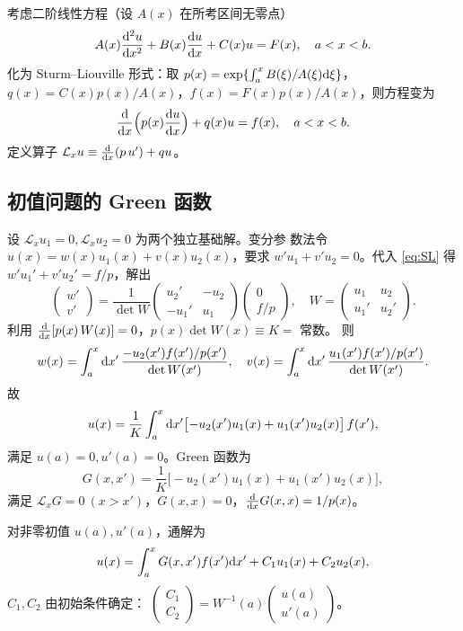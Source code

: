 考虑二阶线性方程（设 $A(x)$ 在所考区间无零点）
\begin{equation}\label{eq:A-2nd}
A(x)\frac{\mathrm{d}^2 u}{\mathrm{d} x^2}+B(x)\frac{\mathrm{d} u}{\mathrm{d} x}+C(x)u=F(x),
\quad a<x<b.
\end{equation}
化为 Sturm--Liouville 形式：取 $p(x)=\exp\{\int_a^x B(\xi)/A(\xi)\mathrm{d}\xi\}$，
$q(x)=C(x)p(x)/A(x)$，$f(x)=F(x)p(x)/A(x)$，则方程变为
\begin{equation}\label{eq:SL}
\frac{\mathrm{d}}{\mathrm{d} x}\Bigl(p(x)\frac{\mathrm{d} u}{\mathrm{d} x}\Bigr)+q(x)u=f(x),
\quad a<x<b.
\end{equation}
定义算子 $\mathcal L_x u\equiv \frac{\mathrm{d}}{\mathrm{d} x}(p\,u')+q u$。

\subsection*{初值问题的 Green 函数}

设 $\mathcal L_x u_1=0,\mathcal L_x u_2=0$ 为两个独立基础解。变分参
数法令 $u(x)=w(x)u_1(x)+v(x)u_2(x)$，要求 $w'u_1+v'u_2=0$。代入
\eqref{eq:SL} 得 $w'u_1'+v'u_2'=f/p$，解出
\[
\begin{pmatrix}w'\\ v'\end{pmatrix}
=\frac{1}{\det W}\begin{pmatrix}u_2'& -u_2\\ -u_1'& u_1\end{pmatrix}
\begin{pmatrix}0\\ f/p\end{pmatrix},
\quad
W=\begin{pmatrix}u_1& u_2\\ u_1'& u_2'\end{pmatrix}.
\]
利用 $\frac{\mathrm{d}}{\mathrm{d} x}[p(x)\,W(x)]=0$，$p(x)\det W(x)\equiv K=$ 常数。
则
\[
w(x)=\int_a^x \mathrm{d} x'\,\frac{-u_2(x')f(x')/p(x')}{\det W(x')},\quad
v(x)=\int_a^x \mathrm{d} x'\,\frac{u_1(x')f(x')/p(x')}{\det W(x')}.
\]
故
\begin{equation}
u(x)=\frac{1}{K}\int_a^x\mathrm{d} x'\bigl[-u_2(x')u_1(x)+u_1(x')u_2(x)\bigr]\,f(x'),
\end{equation}
满足 $u(a)=0,u'(a)=0$。Green 函数为
\begin{equation}\label{eq:Green-IVP}
G(x,x')=\frac{1}{K}\bigl[-u_2(x')u_1(x)+u_1(x')u_2(x)\bigr],
\end{equation}
满足 $\mathcal L_x G=0\ (x>x')$，$G(x,x)=0$，$\frac{\mathrm{d}}{\mathrm{d} x}G(x,x)=1/p(x)$。

对非零初值 $u(a),u'(a)$，通解为
\[
u(x)=\int_a^x G(x,x')f(x')\mathrm{d} x'+C_1 u_1(x)+C_2 u_2(x),
\]
$C_1,C_2$ 由初始条件确定：
$\begin{pmatrix}C_1\\C_2\end{pmatrix}=W^{-1}(a)\begin{pmatrix}u(a)\\u'(a)\end{pmatrix}$。

